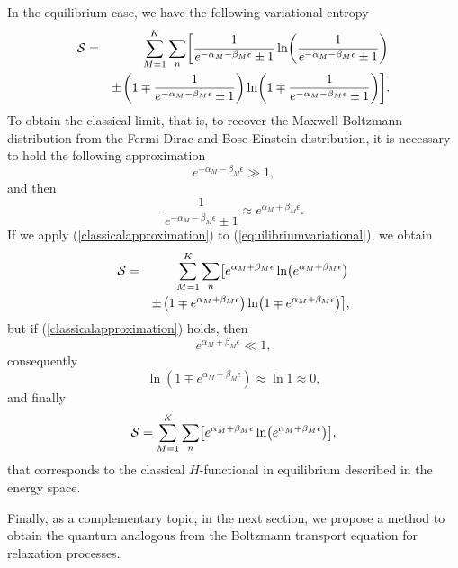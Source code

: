 In the equilibrium case, we have the following variational entropy
\begin{eqnarray}
    \Ss&=& \sum_{M=1}^{K}\sum_{n}
        \left[
                \frac{1}{e^{-\alpha_M-\beta_M \epsilon}\pm 1} \ln 
                    \left(
                            \frac{1}{e^{-\alpha_M-\beta_M \epsilon}\pm 1}
                    \right)
        \right. \nonumber \\
          && \pm \left. \left(
                        1 \mp \frac{1}{e^{-\alpha_M-\beta_M \epsilon}\pm 1}
                  \right) \ln
                \left(
                        1 \mp \frac{1}{e^{-\alpha_M-\beta_M \epsilon}\pm 1}            
                \right) \right]. \label{equilibriumvariational}
\end{eqnarray}
To obtain the classical limit, that is, to recover the Maxwell-Boltzmann distribution from the Fermi-Dirac and Bose-Einstein distribution, it is necessary to hold the following approximation
\begin{equation}
    e^{-\alpha_M-\beta_M \epsilon}\gg 1, \label{classicalapproximation}
\end{equation}
and then
\begin{equation}
    \frac{1}{e^{-\alpha_M-\beta_M \epsilon}\pm 1} \approx e^{\alpha_M+\beta_M \epsilon}.
\end{equation}
If we apply (\ref{classicalapproximation}) to (\ref{equilibriumvariational}), we obtain
\begin{eqnarray}
    \Ss&=& \sum_{M=1}^{K}\sum_{n}
        \left[
                e^{\alpha_M+\beta_M \epsilon} \ln 
                    \left(
                            e^{\alpha_M+\beta_M \epsilon}
                    \right)
        \right. \nonumber \\
          && \pm \left. \left(
                        1 \mp e^{\alpha_M+\beta_M \epsilon}
                  \right) \ln
                \left(
                        1 \mp e^{\alpha_M+\beta_M \epsilon}            
                \right) \right],
\end{eqnarray}
but if (\ref{classicalapproximation}) holds, then 
\begin{equation}
     e^{\alpha_M+\beta_M \epsilon}\ll 1,
\end{equation}
consequently 
\begin{equation}
    \ln(1\mp e^{\alpha_M+\beta_M \epsilon}) \approx \ln 1 \approx 0,
\end{equation}
and finally
\begin{equation}
    \Ss=\sum_{M=1}^{K}\sum_{n}
        \left[
                e^{\alpha_M+\beta_M \epsilon} \ln 
                    \left(
                            e^{\alpha_M+\beta_M \epsilon}
                    \right)
        \right],
\end{equation}
that corresponds to the classical $H$-functional in equilibrium described in the energy space.


Finally, as a complementary topic, in the next section, we propose a method to obtain the quantum analogous from the Boltzmann transport equation for relaxation processes.

